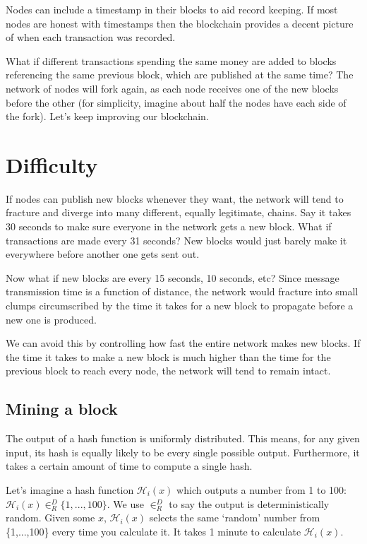 Nodes can include a timestamp in their blocks to aid record keeping. If most nodes are honest with timestamps then the blockchain provides a decent picture of when each transaction was recorded.

What if different transactions spending the same money are added to blocks referencing the same previous block, which are published at the same time? The network of nodes will fork again, as each node receives one of the new blocks before the other (for simplicity, imagine about half the nodes have each side of the fork). Let's keep improving our blockchain.


\section{Difficulty}
\label{sec:difficulty}

If nodes can publish new blocks whenever they want, the network will tend to fracture and diverge into many different, equally legitimate, chains. Say it takes 30 seconds to make sure everyone in the network gets a new block. What if transactions are made every 31 seconds? New blocks would just barely make it everywhere before another one gets sent out. 

Now what if new blocks are every 15 seconds, 10 seconds, etc? Since message transmission time is a function of distance, the network would fracture into small clumps circumscribed by the time it takes for a new block to propagate before a new one is produced.

We can avoid this by controlling how fast the entire network makes new blocks. If the time it takes to make a new block is much higher than the time for the previous block to reach every node, the network will tend to remain intact.


\subsection{Mining a block}

The output of a hash function is uniformly distributed. This means, for any given input, its hash is equally likely to be every single possible output. Furthermore, it takes a certain amount of time to compute a single hash.

Let's imagine a hash function $\mathcal{H}_i(x)$ which outputs a number from 1 to 100: $\mathcal{H}_i(x) \in^D_R \{1,...,100\}$. We use $\in^D_R$ to say the output is deterministically random. Given some $x$, $\mathcal{H}_i(x)$ selects the same `random' number from \{1,...,100\} every time you calculate it. It takes 1 minute to calculate $\mathcal{H}_i(x)$. 

